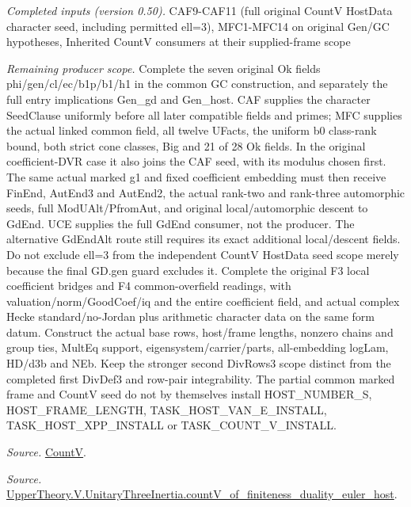 \emph{Completed inputs (version 0.50).} CAF9-CAF11 (full original CountV HostData character seed, including permitted ell=3), MFC1-MFC14 on original Gen/GC hypotheses, Inherited CountV consumers at their supplied-frame scope

\emph{Remaining producer scope.} Complete the seven original Ok fields phi/gen/cl/ec/b1p/b1/h1 in the common GC construction, and separately the full entry implications Gen\_\allowbreak gd and Gen\_\allowbreak host. CAF supplies the character SeedClause uniformly before all later compatible fields and primes; MFC supplies the actual linked common field, all twelve UFacts, the uniform b0 class-rank bound, both strict cone classes, Big and 21 of 28 Ok fields. In the original coefficient-DVR case it also joins the CAF seed, with its modulus chosen first. The same actual marked g1 and fixed coefficient embedding must then receive FinEnd, AutEnd3 and AutEnd2, the actual rank-two and rank-three automorphic seeds, full ModUAlt/PfromAut, and original local/automorphic descent to GdEnd. UCE supplies the full GdEnd consumer, not the producer. The alternative GdEndAlt route still requires its exact additional local/descent fields. Do not exclude ell=3 from the independent CountV HostData seed scope merely because the final GD.gen guard excludes it. Complete the original F3 local coefficient bridges and F4 common-overfield readings, with valuation/norm/GoodCoef/iq and the entire coefficient field, and actual complex Hecke standard/no-Jordan plus arithmetic character data on the same form datum. Construct the actual base rows, host/frame lengths, nonzero chains and group ties, MultEq support, eigensystem/carrier/parts, all-embedding logLam, HD/d3b and NEb. Keep the stronger second DivRows3 scope distinct from the completed first DivDef3 and row-pair integrability. The partial common marked frame and CountV seed do not by themselves install HOST\_\allowbreak NUMBER\_\allowbreak S, HOST\_\allowbreak FRAME\_\allowbreak LENGTH, TASK\_\allowbreak HOST\_\allowbreak VAN\_\allowbreak E\_\allowbreak INSTALL, TASK\_\allowbreak HOST\_\allowbreak XPP\_\allowbreak INSTALL or TASK\_\allowbreak COUNT\_\allowbreak V\_\allowbreak INSTALL.

\emph{Source.} \href{https://github.com/CocoSgt/riemann-hypothesis-lean/blob/7cbf7a0c32fca1badf05931879a37c3f8a2b03b4/src/Development/AutomorphicArithmetic/AutomorphicVarieties/HeightAndVanishing/Counts.lean#L69-L69}{CountV}.

\emph{Source.} \href{https://github.com/CocoSgt/riemann-hypothesis-lean/blob/7cbf7a0c32fca1badf05931879a37c3f8a2b03b4/src/Development/AutomorphicArithmetic/AutomorphicVarieties/ModularityArgument/ThresholdArguments/DenseThresholdCases/CountVOf.lean#L33-L60}{UpperTheory.V.UnitaryThreeInertia.countV\_\allowbreak of\_\allowbreak finiteness\_\allowbreak duality\_\allowbreak euler\_\allowbreak host}.



